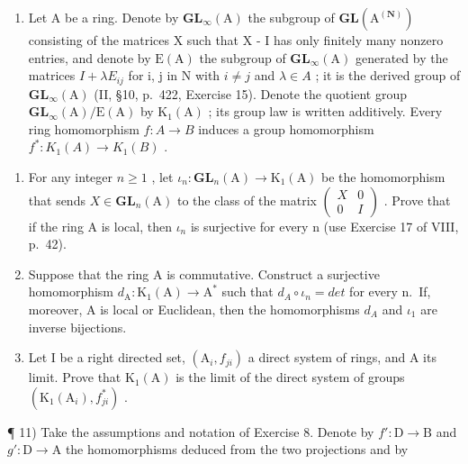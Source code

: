 \begin{enumerate}
\def\labelenumi{\arabic{enumi})}
\setcounter{enumi}{9}
\tightlist
\item
  Let A be a ring. Denote by \(\mathbf{GL}_{\infty}(\mathrm{A})\) the subgroup of \(\mathbf{GL}(\mathrm{A}^{(\mathbf{N})})\) consisting of the matrices X such that X - I has only finitely many nonzero entries, and denote by \(\mathrm{E}(\mathrm{A})\) the subgroup of \(\mathbf{GL}_{\infty}(\mathrm{A})\) generated by the matrices \(I + \lambda E_{ij}\) for i, j in N with \(i \neq j\) and \(\lambda \in A\) ; it is the derived group of \(\mathbf{GL}_{\infty}(\mathrm{A})\) (II, §10, p.~422, Exercise 15). Denote the quotient group \(\mathbf{GL}_{\infty}(\mathrm{A}) / \mathrm{E}(\mathrm{A})\) by \(\mathrm{K}_{1}(\mathrm{A})\) ; its group law is written additively. Every ring homomorphism \(f : A \to B\) induces a group homomorphism \(f^{*} : K_{1}(A) \to K_{1}(B)\) .
\end{enumerate}

\begin{enumerate}
\def\labelenumi{\alph{enumi})}
\item
  For any integer \(n \geqslant 1\) , let \(\iota_{n} : \mathbf{GL}_{n}(\mathrm{A}) \to \mathrm{K}_{1}(\mathrm{A})\) be the homomorphism that sends \(X \in \mathbf{GL}_{n}(\mathrm{A})\) to the class of the matrix \(\begin{pmatrix} X & 0 \\ 0 & I \end{pmatrix}\) . Prove that if the ring A is local, then \(\iota_{n}\) is surjective for every n (use Exercise 17 of VIII, p.~42).
\item
  Suppose that the ring A is commutative. Construct a surjective homomorphism \(d_{\mathrm{A}} : \mathrm{K}_{1}(\mathrm{A}) \to \mathrm{A}^{*}\) such that \(d_{A} \circ \iota_{n} = det\) for every n.~If, moreover, A is local or Euclidean, then the homomorphisms \(d_{A}\) and \(\iota_{1}\) are inverse bijections.
\item
  Let I be a right directed set, \((\mathrm{A}_{i}, f_{ji})\) a direct system of rings, and A its limit. Prove that \(\mathrm{K}_{1}(\mathrm{A})\) is the limit of the direct system of groups \((\mathrm{K}_{1}(\mathrm{A}_{i}), f_{ji}^{*})\) .
\end{enumerate}

¶ 11) Take the assumptions and notation of Exercise 8. Denote by \(f': \mathrm{D} \to \mathrm{B}\) and \(g': \mathrm{D} \to \mathrm{A}\) the homomorphisms deduced from the two projections and by

